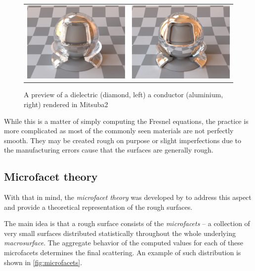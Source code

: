 \begin{figure}[h]
	\centering
	\begin{tabular}{cc}
		\includegraphics[width=.4\linewidth]{img/dielectric_diamond.jpg}
		&
		\includegraphics[width=.4\linewidth]{img/conductor_aluminium.jpg}
	\end{tabular}
	\caption{A preview of a dielectric (diamond, left) a  conductor (aluminium, right) rendered in Mitsuba2~\cite{mitsubaWeb}}
	\label{fig:compare_dielectric_conductor}
\end{figure}

While this is a matter of simply computing the Fresnel equations, the practice is more complicated as most of the commonly seen materials are not perfectly smooth. They may be created rough on purpose or slight imperfections due to the manufacturing errors cause that the surfaces are generally rough.

\subsection{Microfacet theory}
With that in mind, the \emph{microfacet theory} was developed by \citet{cook1982reflectance} to address this aspect and provide a theoretical representation of the rough surfaces.

The main idea is that a rough surface consists of the \emph{microfacets} -- a collection of very small surfaces distributed statistically throughout the whole underlying \emph{macrosurface}. The aggregate behavior of the computed values for each of these microfacets determines the final scattering. An example of such distribution is shown in \autoref{fig:microfacets}.

